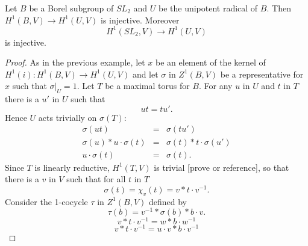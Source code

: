 \begin{lemma} Let $B$ be a Borel subgroup of $SL_2$ and $U$ be the unipotent radical of $B$. Then $H^1(B, V)\rightarrow H^1(U, V)$ is injective. Moreover
\begin{displaymath}
	H^1(SL_2, V)\rightarrow H^1(U, V)
\end{displaymath}
is injective.
\end{lemma}
\begin{proof}
As in the previous example, let $x$ be an element of the kernel of $H^1(i):H^1(B,V)\rightarrow H^1(U,V)$ and let $\sigma$ in $Z^1(B,V)$ be a representative for $x$ such that $\sigma|_U = 1$. Let $T$ be a maximal torus for $B$. For any $u$ in $U$ and $t$ in $T$ there is a $u'$ in $U$ such that
\begin{displaymath}
	ut = tu'.
\end{displaymath}
Hence $U$ acts trivially on $\sigma(T)$:
\begin{eqnarray*}
	\sigma(ut) &=& \sigma(tu')\\
	\sigma(u)*u\cdot\sigma(t) &=& \sigma(t)*t\cdot\sigma(u')\\
	u\cdot\sigma(t) &=& \sigma(t).
\end{eqnarray*}
Since $T$ is linearly reductive, $H^1(T, V)$ is trivial [prove or reference], so that there is a $v$ in $V$ such that for all $t$ in $T$
\begin{displaymath}
	\sigma(t) = \chi_v(t) = v*t\cdot v^{-1}.
\end{displaymath}
Consider the 1-cocycle $\tau$ in $Z^1(B, V)$ defined by
\begin{displaymath}
	\tau(b) = v^{-1}*\sigma(b)*b\cdot v.
\end{displaymath}
\begin{displaymath}
	v*t\cdot v^{-1} = w*b\cdot w^{-1}
\end{displaymath}
\begin{displaymath}
	v*t\cdot v^{-1} = u\cdot v*b\cdot v^{-1}
\end{displaymath}
\end{proof}
